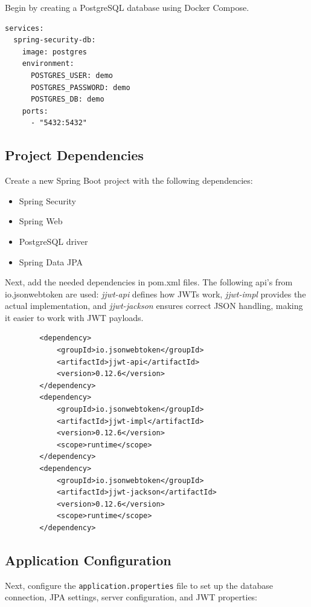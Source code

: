 Begin by creating a PostgreSQL database using Docker Compose.

\begin{lstlisting}
services:
  spring-security-db:
    image: postgres
    environment:
      POSTGRES_USER: demo
      POSTGRES_PASSWORD: demo
      POSTGRES_DB: demo
    ports:
      - "5432:5432"
\end{lstlisting}

\subsection*{Project Dependencies}

Create a new Spring Boot project with the following dependencies:

\begin{itemize}
\item Spring Security
\item Spring Web
\item PostgreSQL driver
\item Spring Data JPA
\end{itemize}

Next, add the needed dependencies in pom.xml files.  The following api's from io.jsonwebtoken are used: \textit{jjwt-api} defines how JWTs work, \textit{jjwt-impl} provides the actual implementation, and \textit{jjwt-jackson} ensures correct JSON handling, making it easier to work with JWT payloads.

\begin{lstlisting}
		<dependency>
            <groupId>io.jsonwebtoken</groupId>
            <artifactId>jjwt-api</artifactId>
            <version>0.12.6</version>
        </dependency>
        <dependency>
            <groupId>io.jsonwebtoken</groupId>
            <artifactId>jjwt-impl</artifactId>
            <version>0.12.6</version>
            <scope>runtime</scope>
        </dependency>
        <dependency>
            <groupId>io.jsonwebtoken</groupId>
            <artifactId>jjwt-jackson</artifactId>
            <version>0.12.6</version>
            <scope>runtime</scope>
        </dependency>
\end{lstlisting}

\subsection*{Application Configuration}

Next, configure the \texttt{application.properties} file to set up the database connection,  JPA settings, server configuration, and JWT properties:

